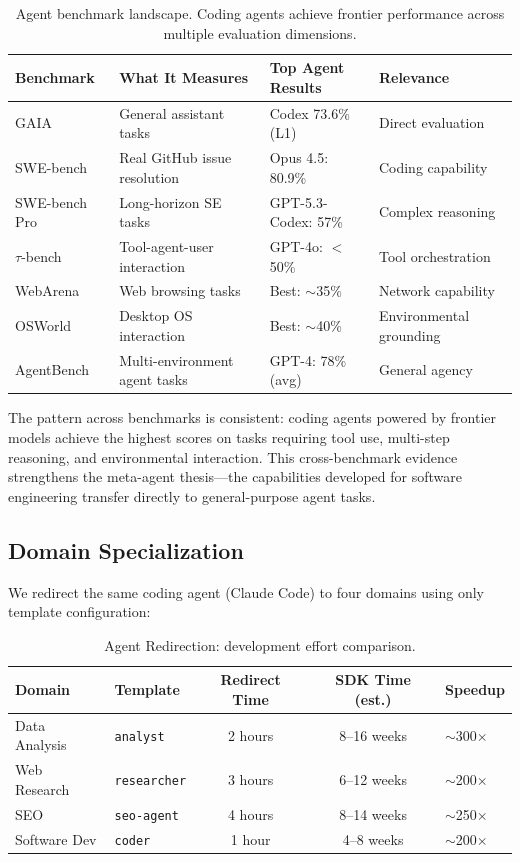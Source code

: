\begin{table}[h]
\caption{Agent benchmark landscape. Coding agents achieve frontier performance across multiple evaluation dimensions.}
\label{tab:benchmarks}
\centering
\small
\begin{tabular}{@{}llll@{}}
\toprule
\textbf{Benchmark} & \textbf{What It Measures} & \textbf{Top Agent Results} & \textbf{Relevance} \\
\midrule
GAIA \citep{mialon2023gaia} & General assistant tasks & Codex 73.6\% (L1) & Direct evaluation \\
SWE-bench \citep{jimenez2024swebench} & Real GitHub issue resolution & Opus 4.5: 80.9\% & Coding capability \\
SWE-bench Pro & Long-horizon SE tasks & GPT-5.3-Codex: 57\% & Complex reasoning \\
$\tau$-bench \citep{taubench2024} & Tool-agent-user interaction & GPT-4o: $<$50\% & Tool orchestration \\
WebArena \citep{webarena2024} & Web browsing tasks & Best: $\sim$35\% & Network capability \\
OSWorld \citep{osworld2024} & Desktop OS interaction & Best: $\sim$40\% & Environmental grounding \\
AgentBench \citep{agentbench2023} & Multi-environment agent tasks & GPT-4: 78\% (avg) & General agency \\
\bottomrule
\end{tabular}
\end{table}

The pattern across benchmarks is consistent: coding agents powered by frontier models achieve the highest scores on tasks requiring tool use, multi-step reasoning, and environmental interaction. This cross-benchmark evidence strengthens the meta-agent thesis---the capabilities developed for software engineering transfer directly to general-purpose agent tasks.

\subsection{Domain Specialization}

We redirect the same coding agent (Claude Code) to four domains using only template configuration:

\begin{table}[h]
\caption{Agent Redirection: development effort comparison.}
\label{tab:specialization}
\centering
\small
\begin{tabular}{@{}llccl@{}}
\toprule
\textbf{Domain} & \textbf{Template} & \textbf{Redirect Time} & \textbf{SDK Time (est.)} & \textbf{Speedup} \\
\midrule
Data Analysis & \texttt{analyst} & 2 hours & 8--16 weeks & $\sim$300$\times$ \\
Web Research & \texttt{researcher} & 3 hours & 6--12 weeks & $\sim$200$\times$ \\
SEO & \texttt{seo-agent} & 4 hours & 8--14 weeks & $\sim$250$\times$ \\
Software Dev & \texttt{coder} & 1 hour & 4--8 weeks & $\sim$200$\times$ \\
\bottomrule
\end{tabular}
\end{table}

